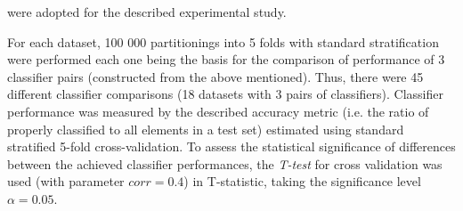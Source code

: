 \documentclass[final,3p,times,onecolumn]{elsarticle}
\begin{document}
were adopted for the described experimental study.


\begin{table}[!htb]
    \centering
    \caption{Overview od datasets applied in tests for Section 3.1.}
    \label{tab:pdatasets}
    \begin{adjustbox}{angle=0}
    \footnotesize

    \end{adjustbox}
\end{table}

For each dataset, 100 000 partitionings into 5 folds with standard stratification were performed each one being the basis for the comparison of performance of 3 classifier pairs (constructed from the above mentioned). Thus, there were 45 different classifier comparisons (18 datasets with 3 pairs of classifiers). Classifier performance was measured by the described accuracy metric (i.e. the ratio of properly classified to all elements in a test set) estimated using standard stratified 5-fold cross-validation. To assess the statistical significance of differences between the achieved classifier performances, the \emph{T-test} for cross validation was used (with parameter $corr=0.4$) in T-statistic, taking the significance level $\alpha=0.05$.
\end{document}
